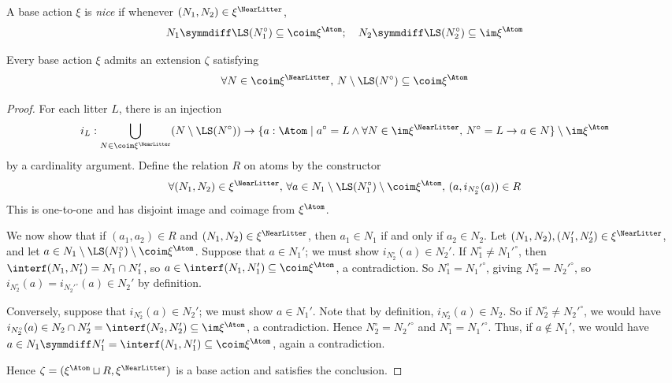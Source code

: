 \begin{definition}
  \label{def:BaseAction.Nice}
  \leanok
  A base action \( \xi \) is \emph{nice} if whenever \( (N_1, N_2) \in \xi^\NearLitter \),
  \[ N_1 \symmdiff \LS(N_1^\circ) \subseteq \coim \xi^\Atom;\quad N_2 \symmdiff \LS(N_2^\circ) \subseteq \im \xi^\Atom \]
\end{definition}
\begin{proposition}
  \label{prop:BaseAction.exists_inside}
  \leanok
  Every base action \( \xi \) admits an extension \( \zeta \) satisfying
  \[ \forall N \in \coim \xi^\NearLitter,\, N \setminus \LS(N^\circ) \subseteq \coim \xi^\Atom \]
\end{proposition}
\begin{proof}
  \leanok
  For each litter \( L \), there is an injection
  \[ i_L : \bigcup_{N \in \coim \xi^\NearLitter} (N \setminus \LS(N^\circ)) \to \{ a : \Atom \mid a^\circ = L \wedge \forall N \in \im \xi^\NearLitter,\, N^\circ = L \to a \in N \} \setminus \im \xi^\Atom \]
  by a cardinality argument.
  Define the relation \( R \) on atoms by the constructor
  \[ \forall (N_1, N_2) \in \xi^\NearLitter,\, \forall a \in N_1 \setminus \LS(N_1^\circ) \setminus \coim \xi^\Atom,\, (a, i_{N_2^\circ}(a)) \in R \]
  This is one-to-one and has disjoint image and coimage from \( \xi^\Atom \).

  We now show that if \( (a_1, a_2) \in R \) and \( (N_1, N_2) \in \xi^\NearLitter \), then \( a_1 \in N_1 \) if and only if \( a_2 \in N_2 \).
  Let \( (N_1, N_2), (N_1', N_2') \in \xi^\NearLitter \), and let \( a \in N_1 \setminus \LS(N_1^\circ) \setminus \coim \xi^\Atom \).
  Suppose that \( a \in N_1' \); we must show \( i_{N_2^\circ}(a) \in N_2' \).
  If \( N_1^\circ \neq {N_1'}^\circ \), then \( \interf(N_1, N_1') = N_1 \cap N_1' \), so \( a \in \interf(N_1, N_1') \subseteq \coim \xi^\Atom \), a contradiction.
  So \( N_1^\circ = {N_1'}^\circ \), giving \( N_2^\circ = {N_2'}^\circ \), so \( i_{N_2^\circ}(a) = i_{{N_2'}^\circ}(a) \in N_2' \) by definition.

  Conversely, suppose that \( i_{N_2^\circ}(a) \in N_2' \); we must show \( a \in N_1' \).
  Note that by definition, \( i_{N_2^\circ}(a) \in N_2 \).
  So if \( N_2^\circ \neq {N_2'}^\circ \), we would have \( i_{N_2^\circ}(a) \in N_2 \cap N_2' = \interf(N_2, N_2') \subseteq \im \xi^\Atom \), a contradiction.
  Hence \( N_2^\circ = {N_2'}^\circ \) and \( N_1^\circ = {N_1'}^\circ \).
  Thus, if \( a \notin N_1' \), we would have \( a \in N_1 \symmdiff N_1' = \interf(N_1, N_1') \subseteq \coim \xi^\Atom \), again a contradiction.

  Hence \( \zeta = (\xi^\Atom \sqcup R, \xi^\NearLitter) \) is a base action and satisfies the conclusion.
\end{proof}
